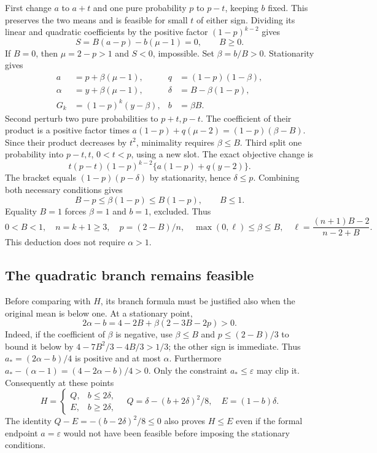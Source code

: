 \documentclass[11pt]{article}
\newcommand{\eps}{\varepsilon}
\newcommand{\E}{\mathbb E}
\begin{document}
First change $a$ to $a+t$ and one pure probability $p$ to $p-t$,
keeping $b$ fixed. This preserves the two means and is feasible for
small $t$ of either sign. Dividing its linear and quadratic
coefficients by the positive factor $(1-p)^{k-2}$ gives
\[
 S=B(a-p)-b(\mu-1)=0,\qquad B\ge0.
\]
If $B=0$, then $\mu=2-p>1$ and $S<0$, impossible. Set
$\beta=b/B>0$. Stationarity gives
\begin{align}
 a&=p+\beta(\mu-1),& q&=(1-p)(1-\beta),\nonumber\\
 \alpha&=y+\beta(\mu-1),&\delta&=B-\beta(1-p),\label{eq:param}\\
 G_k&=(1-p)^k(y-\beta),&b&=\beta B.\nonumber
\end{align}
Second perturb two pure probabilities to $p+t,p-t$. The coefficient
of their product is a positive factor times
$a(1-p)+q(\mu-2)=(1-p)(\beta-B)$. Since their product decreases
by $t^2$, minimality requires $\beta\le B$.
Third split one probability into $p-t,t$, $0<t<p$, using a new slot.
The exact objective change is
\[
 t(p-t)(1-p)^{k-2}\{a(1-p)+q(y-2)\}.
\]
The bracket equals $(1-p)(p-\delta)$ by stationarity, hence
$\delta\le p$. Combining both necessary conditions gives
\[
 B-p\le\beta(1-p)\le B(1-p),\qquad B\le1.
\]
Equality $B=1$ forces $\beta=1$ and $b=1$, excluded. Thus
\begin{equation}\label{eq:domain}
 0<B<1,\quad n=k+1\ge3,\quad p=(2-B)/n,\quad
 \max(0,\ell)\le\beta\le B,\quad
 \ell=\frac{(n+1)B-2}{n-2+B}.
\end{equation}
This deduction does not require $\alpha>1$.

\subsection{The quadratic branch remains feasible}
Before comparing with $H$, its branch formula must be justified also
when the original mean is below one. At a stationary point,
\[
 2\alpha-b=4-2B+\beta(2-3B-2p)>0.
\]
Indeed, if the coefficient of $\beta$ is negative, use $\beta\le B$
and $p\le(2-B)/3$ to bound it below by
$4-7B^2/3-4B/3>1/3$; the other sign is immediate.
Thus $a_*=(2\alpha-b)/4$ is positive and at most $\alpha$.
Furthermore $a_*-(\alpha-1)=(4-2\alpha-b)/4>0$.
Only the constraint $a_*\le\eps$ may clip it. Consequently at these
points
\begin{equation}\label{eq:branches}
 H=\begin{cases}Q,&b\le2\delta,\\E,&b\ge2\delta,\end{cases}
 \quad Q=\delta-(b+2\delta)^2/8,\quad E=(1-b)\delta.
\end{equation}
The identity $Q-E=-(b-2\delta)^2/8\le0$ also proves $H\le E$
even if the formal endpoint $a=\eps$ would
not have been feasible before imposing the stationary conditions.
\end{document}
